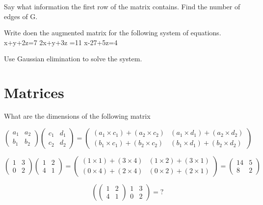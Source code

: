 \documentclass[]{report}
\begin{document}
\begin{itemize}
Say what information the first row of the matrix contains.
Find the number of edges of G.


Write doen the augmented matrix for the following system of equations.
x+y+2z=7
2x+y+3z =11
x-27+5z=4


Use Gaussian elimination to solve the system.


\section{Matrices}

What are the dimensions of the following matrix


\[ \left(
\begin{array}{cc}
a_1 & a_2 \\ 
b_1 & b_2
\end{array} \right)\left(
\begin{array}{cc}
c_1 & d_1 \\ 
c_2 & d_2
\end{array} \right) = \left(
\begin{array}{cc}
(a_1 \times c_1) + (a_2 \times c_2) & (a_1 \times d_1) + (a_2 \times d_2) \\ 
(b_1 \times c_1) + (b_2 \times c_2) & (b_1 \times d_1) + (b_2 \times d_2)
\end{array} \right) \]

\bigskip
\large{
\[ \left(
\begin{array}{cc}
1 & 3 \\ 
0 & 2
\end{array} \right)\left(
\begin{array}{cc}
1 & 2 \\ 
4 & 1
\end{array} \right) = \left(
\begin{array}{cc}
(1 \times 1) + (3 \times 4) & (1 \times 2) + (3 \times 1) \\ 
(0 \times 4) + (2 \times 4) & (0 \times 2) + (2 \times 1)
\end{array} \right) = \left(
\begin{array}{cc}
14 & 5 \\ 
8 & 2
\end{array} \right) \]
}

\[ \left(
\left(
\begin{array}{cc}
1 & 2 \\ 
4 & 1
\end{array} \right)
\begin{array}{cc}
1 & 3 \\ 
0 & 2
\end{array} \right) = ? \]



\end{itemize}
\end{document}
